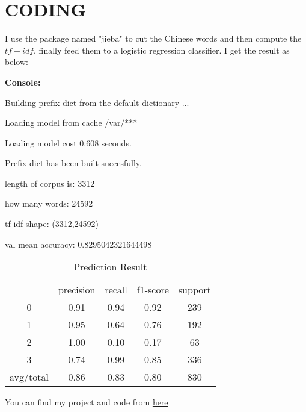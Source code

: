 \documentclass[letterpaper, 10 pt, conference]{ieeeconf}
\begin{document}
\section{CODING}

I use the package named "jieba" to cut the Chinese words and then compute the $tf-idf$, finally feed them to a logistic regression classifier. I get the result as below:

\textbf{Console:}

Building prefix dict from the default dictionary ...

Loading model from cache /var/***

Loading model cost 0.608 seconds.

Prefix dict has been built succesfully.

length of corpus is: 3312

how many words: 24592

tf-idf shape: (3312,24592)

val mean accuracy: 0.8295042321644498

\begin{table}[H]
    \begin{tabular}{ccccc}
       & precision & recall & f1-score & support \\
     0 & 0.91 & 0.94 & 0.92 & 239 \\
     1 & 0.95 & 0.64 & 0.76 & 192 \\
     2 & 1.00 & 0.10 & 0.17 & 63 \\
     3 & 0.74 & 0.99 & 0.85 & 336 \\
     avg/total & 0.86 & 0.83 & 0.80 & 830
    \end{tabular}
    \caption{Prediction Result}
    \label{tab:tab1}
\end{table}
You can find my project and code from \href{https://pan.baidu.com/s/1Fc5irGh6lkKgajQBiG0m2Q}{here}
\end{document}
